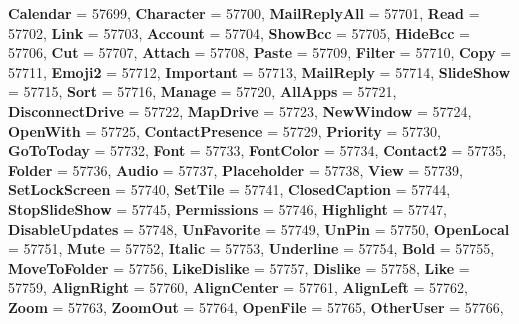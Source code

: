\begin{DoxyCompactItemize}
{\bfseries Calendar} = 57699, 
{\bfseries Character} = 57700, 
\newline
{\bfseries Mail\+Reply\+All} = 57701, 
{\bfseries Read} = 57702, 
{\bfseries Link} = 57703, 
{\bfseries Account} = 57704, 
\newline
{\bfseries Show\+Bcc} = 57705, 
{\bfseries Hide\+Bcc} = 57706, 
{\bfseries Cut} = 57707, 
{\bfseries Attach} = 57708, 
\newline
{\bfseries Paste} = 57709, 
{\bfseries Filter} = 57710, 
{\bfseries Copy} = 57711, 
{\bfseries Emoji2} = 57712, 
\newline
{\bfseries Important} = 57713, 
{\bfseries Mail\+Reply} = 57714, 
{\bfseries Slide\+Show} = 57715, 
{\bfseries Sort} = 57716, 
\newline
{\bfseries Manage} = 57720, 
{\bfseries All\+Apps} = 57721, 
{\bfseries Disconnect\+Drive} = 57722, 
{\bfseries Map\+Drive} = 57723, 
\newline
{\bfseries New\+Window} = 57724, 
{\bfseries Open\+With} = 57725, 
{\bfseries Contact\+Presence} = 57729, 
{\bfseries Priority} = 57730, 
\newline
{\bfseries Go\+To\+Today} = 57732, 
{\bfseries Font} = 57733, 
{\bfseries Font\+Color} = 57734, 
{\bfseries Contact2} = 57735, 
\newline
{\bfseries Folder} = 57736, 
{\bfseries Audio} = 57737, 
{\bfseries Placeholder} = 57738, 
{\bfseries View} = 57739, 
\newline
{\bfseries Set\+Lock\+Screen} = 57740, 
{\bfseries Set\+Tile} = 57741, 
{\bfseries Closed\+Caption} = 57744, 
{\bfseries Stop\+Slide\+Show} = 57745, 
\newline
{\bfseries Permissions} = 57746, 
{\bfseries Highlight} = 57747, 
{\bfseries Disable\+Updates} = 57748, 
{\bfseries Un\+Favorite} = 57749, 
\newline
{\bfseries Un\+Pin} = 57750, 
{\bfseries Open\+Local} = 57751, 
{\bfseries Mute} = 57752, 
{\bfseries Italic} = 57753, 
\newline
{\bfseries Underline} = 57754, 
{\bfseries Bold} = 57755, 
{\bfseries Move\+To\+Folder} = 57756, 
{\bfseries Like\+Dislike} = 57757, 
\newline
{\bfseries Dislike} = 57758, 
{\bfseries Like} = 57759, 
{\bfseries Align\+Right} = 57760, 
{\bfseries Align\+Center} = 57761, 
\newline
{\bfseries Align\+Left} = 57762, 
{\bfseries Zoom} = 57763, 
{\bfseries Zoom\+Out} = 57764, 
{\bfseries Open\+File} = 57765, 
\newline
{\bfseries Other\+User} = 57766, 

\end{DoxyCompactItemize}
